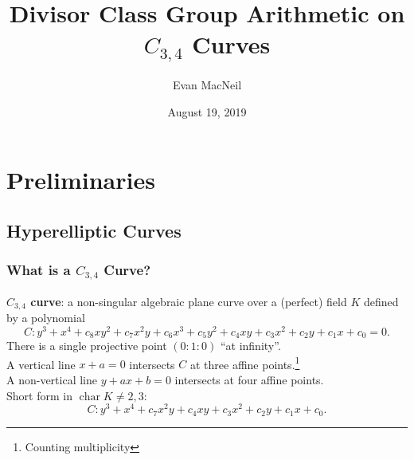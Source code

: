 \documentclass{beamer}
\title[$C_{3,4}$ Arithmetic]{Divisor Class Group Arithmetic on $C_{3,4}$ Curves} %
\author{Evan MacNeil} %
\institute[UofC] %
{
University of Calgary \\ %
\medskip
\textit{macneil.evan@ucalgary.ca} %
}
\date{August 19, 2019} %
\newcommand{\defn}{\textbf}
\DeclareMathOperator{\Char}{char}
\begin{document}
\begin{frame}
\titlepage %
\end{frame}



\section{Preliminaries} 

\subsection{Hyperelliptic Curves} 

\begin{frame}
\frametitle{What is a $C_{3,4}$ Curve?}
\defn{$C_{3,4}$ curve}: a non-singular algebraic plane curve over a (perfect) field $K$ defined by a polynomial
	\[ C : y^3 + x^4 + c_8xy^2 + c_7x^2y + c_6x^3 + c_5y^2 + c_4xy + c_3x^2 + c_2y + c_1x + c_0 = 0. \]
There is a single projective point $(0 : 1 : 0)$ ``at infinity''.\\
A vertical line $x + a = 0$ intersects $C$ at three affine points.\footnote{Counting multiplicity} \\
A non-vertical line $y + ax + b = 0$ intersects at four affine points. \\
\vspace{10pt}
Short form in $\Char K \neq 2,3$:
  \[ C : y^3 + x^4 + c_7x^2y + c_4xy + c_3x^2 + c_2y + c_1x + c_0. \]
\end{frame}
\end{document}
